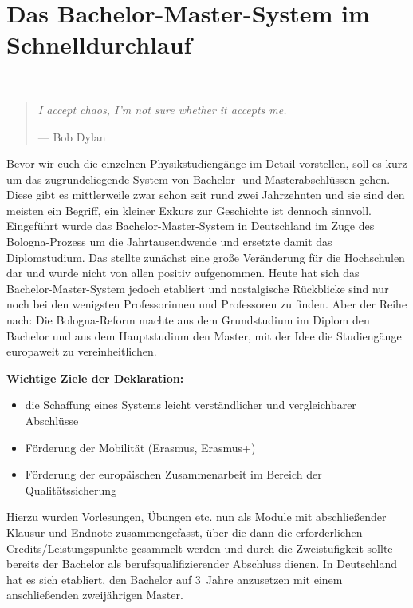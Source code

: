 \section{Das Bachelor-Master-System im Schnelldurchlauf}
~
\begin{multicols}{2}
\begin{quote}
	\textit{\foreignlanguage{english}{I accept chaos, I'm not sure whether it accepts me.}}

	\hfill--- Bob Dylan
\end{quote}
Bevor wir euch die einzelnen Physikstudiengänge im Detail vorstellen, soll es kurz um das zugrundeliegende System von Bachelor- und Masterabschlüssen gehen.
Diese gibt es mittlerweile zwar schon seit rund zwei Jahrzehnten und sie sind den meisten ein Begriff, ein kleiner Exkurs zur Geschichte ist dennoch sinnvoll.
Eingeführt wurde das Bachelor-Master-System in Deutschland im Zuge des Bologna-Prozess um die Jahrtausendwende und ersetzte damit das Diplomstudium.
Das stellte zunächst eine große Veränderung für die Hochschulen dar und wurde nicht von allen positiv aufgenommen.
Heute hat sich das Bachelor-Master-System jedoch etabliert und nostalgische Rückblicke sind nur noch bei den wenigsten Professorinnen und Professoren zu finden.
Aber der Reihe nach: Die Bologna-Reform machte aus dem Grundstudium im Diplom den Bachelor und aus dem Hauptstudium den Master, mit der Idee die Studiengänge europaweit zu vereinheitlichen.

\textbf{Wichtige Ziele der Deklaration:}
\begin{itemize}
	\item die Schaffung eines Systems leicht verständlicher und vergleichbarer Abschlüsse
	\item Förderung der Mobilität (Erasmus, Erasmus+)
	\item Förderung der europäischen Zusammenarbeit im Bereich der Qualitätssicherung
\end{itemize}

Hierzu wurden Vorlesungen, Übungen etc. nun als Module mit abschließender Klausur und Endnote zusammengefasst, über die dann die erforderlichen Credits/Leistungspunkte gesammelt werden und durch die Zweistufigkeit sollte bereits der Bachelor als berufsqualifizierender Abschluss dienen.
In Deutschland hat es sich etabliert, den Bachelor auf 3~Jahre anzusetzen mit einem anschließenden zweijährigen Master.


\end{multicols}
